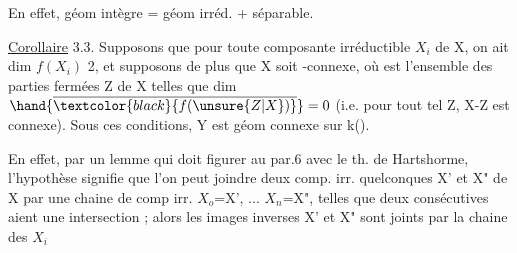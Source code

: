 En effet, géom intègre = géom irréd. + séparable.

\uline{Corollaire} 3.3. Supposons  que pour toute composante irréductible $X_i$
de X, on ait dim $f(X_i)$ 2, et supposons de plus que X soit -connexe,
où  est l'ensemble des parties fermées Z de X telles que dim $\hand{\overline{\textcolor{black}{f(\unsure{Z|X})}}}=0$
(i.e. pour tout tel Z, X-Z est connexe). Sous ces conditions, Y\hand{$_\eta$} est
géom connexe sur k(\hand{$\eta$}).

En effet, par un lemme qui doit figurer au par.6 avec le th. de
Hartshorme, l'hypothèse signifie que l'on peut joindre deux comp. irr.
quelconques X' et X" de X par une chaine de comp irr. $X_o$=X', ...
$X_n$=X", telles que deux consécutives aient une intersection ; alors
les images inverses X'\hand{$_\eta$} et X"\hand{$_\eta$} sont joints par la chaine des $X_{i}$\hand{$_\eta$} 

